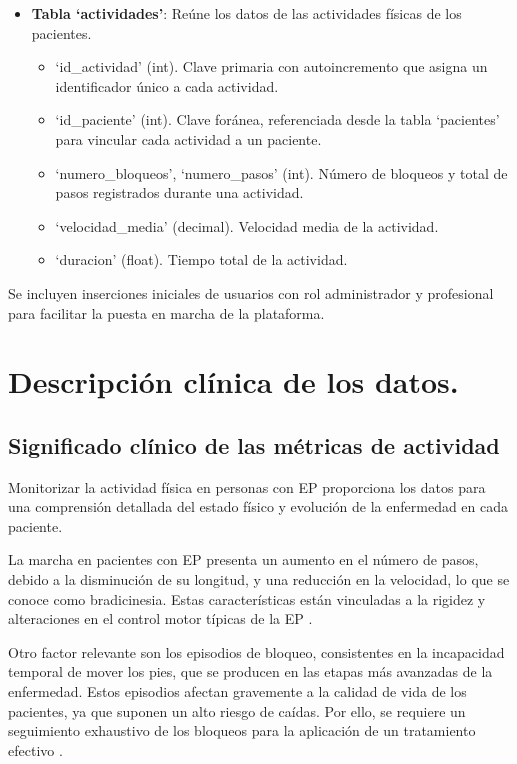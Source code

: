 \begin{itemize}
\begin{itemize}
    \end{itemize}
    \item \textbf{Tabla `actividades'}: Reúne los datos de las actividades físicas de los pacientes.
    \begin{itemize}
        \item `id\_actividad' (int). Clave primaria con autoincremento que asigna un identificador único a cada actividad.
        \item `id\_paciente' (int). Clave foránea, referenciada desde la tabla `pacientes' para vincular cada actividad a un paciente.
        \item `numero\_bloqueos', `numero\_pasos' (int). Número de bloqueos y total de pasos registrados durante una actividad.
        \item `velocidad\_media' (decimal). Velocidad media de la actividad.
        \item `duracion' (float). Tiempo total de la actividad.
    \end{itemize}
\end{itemize}

Se incluyen inserciones iniciales de usuarios con rol administrador y profesional para facilitar la puesta en marcha de la plataforma.

\section{Descripción clínica de los datos.}

\subsection{Significado clínico de las métricas de actividad}
Monitorizar la actividad física en personas con EP proporciona los datos para una comprensión detallada del estado físico y evolución de la enfermedad en cada paciente.

La marcha en pacientes con EP presenta un aumento en el número de pasos, debido a la disminución de su longitud, y una reducción en la velocidad, lo que se conoce como bradicinesia. Estas características están vinculadas a la rigidez y alteraciones en el control motor típicas  de la EP \cite{diBiase2020}. 

Otro factor relevante son los episodios de bloqueo, consistentes en la incapacidad temporal de mover los pies, que se producen en las etapas más avanzadas de la enfermedad. Estos episodios afectan gravemente a la calidad de vida de los pacientes, ya que suponen un alto riesgo de caídas. Por ello, se requiere un seguimiento exhaustivo de los bloqueos para la aplicación de un tratamiento efectivo \cite{diBiase2020}. 

